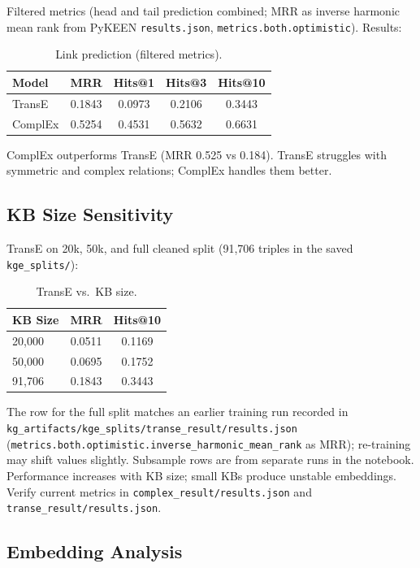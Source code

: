 \documentclass[11pt,a4paper]{article}
\begin{document}
Filtered metrics (head and tail prediction combined; MRR as inverse harmonic mean rank from PyKEEN \texttt{results.json}, \texttt{metrics.both.optimistic}). Results:

\begin{table}[ht]
\centering
\caption{Link prediction (filtered metrics).}
\begin{tabular}{lcccc}
\toprule
\textbf{Model} & \textbf{MRR} & \textbf{Hits@1} & \textbf{Hits@3} & \textbf{Hits@10} \\
\midrule
TransE  & 0.1843 & 0.0973 & 0.2106 & 0.3443 \\
ComplEx & 0.5254 & 0.4531 & 0.5632 & 0.6631 \\
\bottomrule
\end{tabular}
\end{table}

ComplEx outperforms TransE (MRR 0.525 vs 0.184). TransE struggles with symmetric and complex relations; ComplEx handles them better.

\subsection{KB Size Sensitivity}

TransE on 20k, 50k, and full cleaned split (91,706 triples in the saved \texttt{kge\_splits/}):

\begin{table}[ht]
\centering
\caption{TransE vs.\ KB size.}
\begin{tabular}{lcc}
\toprule
\textbf{KB Size} & \textbf{MRR} & \textbf{Hits@10} \\
\midrule
20,000 & 0.0511 & 0.1169 \\
50,000 & 0.0695 & 0.1752 \\
91,706 & 0.1843 & 0.3443 \\
\bottomrule
\end{tabular}
\end{table}

The row for the full split matches an earlier training run recorded in \texttt{kg\_artifacts/kge\_splits/transe\_result/results.json} (\texttt{metrics.both.optimistic.inverse\_harmonic\_mean\_rank} as MRR); re-training may shift values slightly. Subsample rows are from separate runs in the notebook. Performance increases with KB size; small KBs produce unstable embeddings. Verify current metrics in \texttt{complex\_result/results.json} and \texttt{transe\_result/results.json}.

\subsection{Embedding Analysis}
\end{document}
